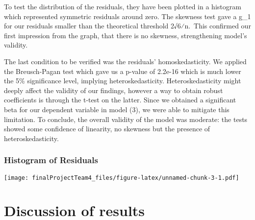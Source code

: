 \documentclass[
]{article}
\newenvironment{Shaded}{\begin{snugshade}}{\end{snugshade}}
\newcommand{\AttributeTok}[1]{\textcolor[rgb]{0.77,0.63,0.00}{#1}}
\newcommand{\FunctionTok}[1]{\textcolor[rgb]{0.00,0.00,0.00}{#1}}
\newcommand{\NormalTok}[1]{#1}
\newcommand{\SpecialCharTok}[1]{\textcolor[rgb]{0.00,0.00,0.00}{#1}}
\newcommand{\StringTok}[1]{\textcolor[rgb]{0.31,0.60,0.02}{#1}}
\begin{document}
To test the distribution of the residuals, they have been plotted in a
histogram which represented symmetric residuals around zero. The
skewness test gave a g\_1 for our residuals smaller than the theoretical
threshold 2√6⁄n.~This confirmed our first impression from the graph,
that there is no skewness, strengthening model's validity.

The last condition to be verified was the residuals' homoskedasticity.
We applied the Breusch-Pagan test which gave us a p-value of 2.2e-16
which is much lower the 5\% significance level, implying
heteroskedasticity. Heteroskedasticity might deeply affect the validity
of our findings, however a way to obtain robust coefficients is through
the t-test on the latter. Since we obtained a significant beta for our
dependent variable in model (3), we were able to mitigate this
limitation. To conclude, the overall validity of the model was moderate:
the tests showed some confidence of linearity, no skewness but the
presence of heteroskedasticity.

\hypertarget{histogram-of-residuals}{%
\subsubsection{Histogram of Residuals}\label{histogram-of-residuals}}

\begin{Shaded}
\end{Shaded}

\texttt{[image: finalProjectTeam4\_files/figure-latex/unnamed-chunk-3-1.pdf]}

\hypertarget{discussion-of-results}{%
\section{Discussion of results}\label{discussion-of-results}}
\end{document}
